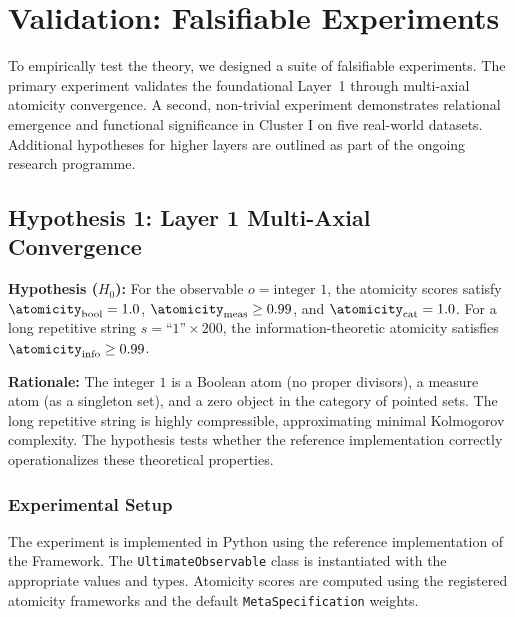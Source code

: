 \section{Validation: Falsifiable Experiments}
\label{sec:validation}

To empirically test the theory, we designed a suite of falsifiable experiments. The primary experiment validates the foundational Layer~1 through multi-axial atomicity convergence. A second, non-trivial experiment demonstrates relational emergence and functional significance in Cluster I on five real-world datasets. Additional hypotheses for higher layers are outlined as part of the ongoing research programme.

\subsection{Hypothesis 1: Layer 1 Multi-Axial Convergence}
\label{subsec:validation-h1}

\textbf{Hypothesis ($H_0$):} For the observable $o = \text{integer } 1$, the atomicity scores satisfy $\atomicity_{\text{bool}} = 1.0$, $\atomicity_{\text{meas}} \ge 0.99$, and $\atomicity_{\text{cat}} = 1.0$. For a long repetitive string $s = \text{``1''} \times 200$, the information-theoretic atomicity satisfies $\atomicity_{\text{info}} \ge 0.99$.

\textbf{Rationale:} The integer $1$ is a Boolean atom (no proper divisors), a measure atom (as a singleton set), and a zero object in the category of pointed sets. The long repetitive string is highly compressible, approximating minimal Kolmogorov complexity. The hypothesis tests whether the reference implementation correctly operationalizes these theoretical properties.

\subsubsection{Experimental Setup}
The experiment is implemented in Python using the reference implementation of the \Apeiron{} Framework. The \texttt{UltimateObservable} class is instantiated with the appropriate values and types. Atomicity scores are computed using the registered atomicity frameworks and the default \texttt{MetaSpecification} weights.

